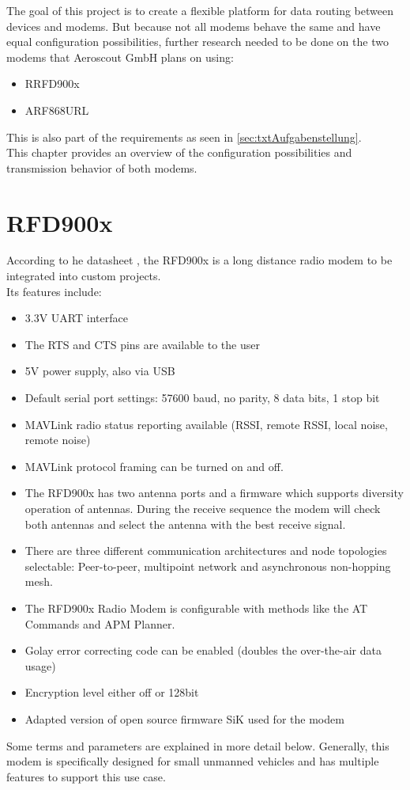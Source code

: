 %
\label{ch:txtModems}
The goal of this project is to create a flexible platform for data routing between devices and modems. But because not all modems behave the same and have equal configuration possibilities, further research needed to be done on the two modems that Aeroscout GmbH plans on using:
\begin{itemize}
    \item RRFD900x
    \item ARF868URL
\end{itemize}
This is also part of the requirements as seen in \autoref{sec:txtAufgabenstellung}.\\
This chapter provides an overview of the configuration possibilities and transmission behavior of both modems.
%
%
%
%
\section{RFD900x} \label{sec:txtRFD900x}
According to he datasheet \cite{RFD900x_Datasheet}, the RFD900x is a long distance radio modem to be integrated into custom projects.\\
Its features include: \begin{itemize}
    \item 3.3V UART interface
    \item The RTS and CTS pins are available to the user
    \item 5V power supply, also via USB
    \item Default serial port settings: 57600 baud, no parity, 8 data bits, 1 stop bit
    \item MAVLink radio status reporting available (RSSI, remote RSSI, local noise, remote noise)
    \item MAVLink protocol framing can be turned on and off.
    \item The RFD900x has two antenna ports and a firmware which supports diversity operation of antennas. During the receive sequence the modem will check both antennas and select the antenna with the best receive signal.
    \item There are three different communication architectures and node topologies selectable: Peer-to-peer, multipoint network and asynchronous non-hopping mesh.
    \item The RFD900x Radio Modem is configurable with methods like the AT Commands and APM Planner.
    \item Golay error correcting code can be enabled (doubles the over-the-air data usage)
    \item Encryption level either off or 128bit 
    \item Adapted version of open source firmware SiK used for the modem
\end{itemize}
Some terms and parameters are explained in more detail below. Generally, this modem is specifically designed for small unmanned vehicles and has multiple features to support this use case.
%
%
